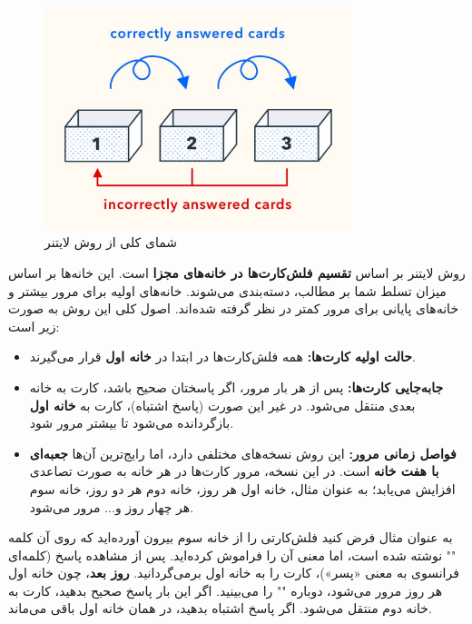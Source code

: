 \documentclass[12pt]{report}
\begin{document}
\begin{figure}[h!]
  \centering
  \includegraphics[width=0.8\textwidth]{images/leitner-overview.png}
  \caption{شمای کلی از روش لایتنر}
  \label{fig:leitner-overview}
\end{figure}

روش لایتنر بر اساس \textbf{تقسیم فلش‌کارت‌ها در خانه‌های مجزا} است. این خانه‌ها بر اساس میزان تسلط شما بر مطالب، دسته‌بندی می‌شوند. خانه‌های اولیه برای مرور بیشتر و خانه‌های پایانی برای مرور کمتر در نظر گرفته شده‌اند. اصول کلی این روش به صورت زیر است:


\begin{itemize}
    \item \textbf{حالت اولیه کارت‌ها:} همه فلش‌کارت‌ها در ابتدا در \textbf{خانه اول} قرار می‌گیرند.
    \item \textbf{جابه‌جایی کارت‌ها:} پس از هر بار مرور، اگر پاسختان صحیح باشد، کارت به خانه بعدی منتقل می‌شود. در غیر این صورت (پاسخ اشتباه)، کارت به \textbf{خانه اول} بازگردانده می‌شود تا بیشتر مرور شود.
    \item \textbf{فواصل زمانی مرور:} این روش نسخه‌های مختلفی دارد، اما رایج‌ترین آن‌ها \textbf{جعبه‌ای با هفت خانه} است. در این نسخه، مرور کارت‌ها در هر خانه به صورت تصاعدی افزایش می‌یابد؛ به عنوان مثال، خانه اول هر روز، خانه دوم هر دو روز، خانه سوم هر چهار روز و... مرور می‌شود.
\end{itemize}

به عنوان مثال فرض کنید فلش‌کارتی را از خانه سوم بیرون آورده‌اید که روی آن کلمه "" نوشته شده است، اما معنی آن را فراموش کرده‌اید. پس از مشاهده پاسخ (کلمه‌ای فرانسوی به معنی «پسر»)، کارت را به خانه اول برمی‌گردانید. \textbf{روز بعد}، چون خانه اول هر روز مرور می‌شود، دوباره "" را می‌بینید. اگر این بار پاسخ صحیح بدهید، کارت به خانه دوم منتقل می‌شود. اگر پاسخ اشتباه بدهید، در همان خانه اول باقی می‌ماند.
\end{document}
